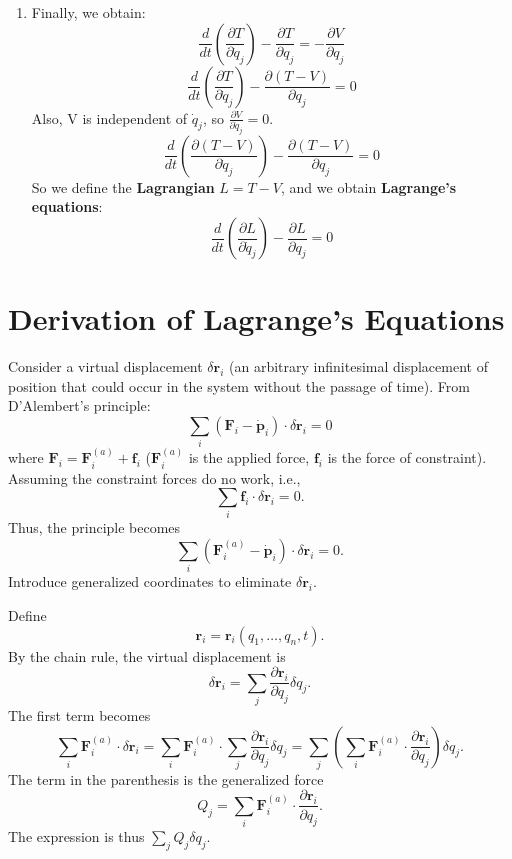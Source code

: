 \documentclass[12pt,a4paper]{article}
\theoremstyle{definition}
\theoremstyle{remark}
\renewcommand{\vec}[1]{\mathbf{#1}}
\begin{document}
\begin{enumerate}
		\item Finally, we obtain:
		\begin{equation*}
			\frac{d}{dt}\left(\frac{\partial T}{\partial \dot{q}_j}\right) - \frac{\partial T}{\partial q_j} = -\frac{\partial V}{\partial q_j}
		\end{equation*}
		\begin{equation*}
			\frac{d}{dt}\left(\frac{\partial T}{\partial \dot{q}_j}\right) - \frac{\partial (T-V)}{\partial q_j} = 0
		\end{equation*}
		Also, V is independent of $\dot{q}_j$, so $\frac{\partial V}{\partial \dot{q}_j} = 0$.
		\begin{equation*}
			\frac{d}{dt}\left(\frac{\partial (T-V)}{\partial \dot{q}_j}\right) - \frac{\partial (T-V)}{\partial q_j} = 0
		\end{equation*}
		So we define the \textbf{Lagrangian} $L=T-V$, and we obtain \textbf{Lagrange's equations}:
		\begin{equation*}
			\frac{d}{dt}\left(\frac{\partial L}{\partial \dot{q}_j}\right) - \frac{\partial L}{\partial q_j} = 0
		\end{equation*}
	\end{enumerate}
	\section{Derivation of Lagrange's Equations }
	Consider a virtual displacement $\delta\vec{r}_i$ (an arbitrary infinitesimal displacement of position that could occur in the system without the passage of time).
	From D'Alembert's principle:
	\begin{equation*}
		\sum_i (\vec{F}_i - \dot{\vec{p}}_i) \cdot \delta\vec{r}_i = 0
	\end{equation*}
	where $\vec{F}_i = \vec{F}_i^{(a)} + \vec{f}_i$ ($\vec{F}_i^{(a)}$ is the applied force, $\vec{f}_i$ is the force of constraint).
	Assuming the constraint forces do no work, i.e.,
	$$ \sum_i \vec{f}_i \cdot \delta\vec{r}_i = 0. $$
	Thus, the principle becomes
	$$ \sum_i (\vec{F}_i^{(a)} - \dot{\vec{p}}_i) \cdot \delta\vec{r}_i = 0. $$
	Introduce generalized coordinates to eliminate $\delta\vec{r}_i$.
	
	Define
	$$ \vec{r}_i = \vec{r}_i(q_1, \dots, q_n, t). $$
	By the chain rule, the virtual displacement is
	$$ \delta\vec{r}_i = \sum_j \frac{\partial \vec{r}_i}{\partial q_j} \delta q_j. $$
	The first term becomes
	$$ \sum_i \vec{F}_i^{(a)} \cdot \delta\vec{r}_i = \sum_i \vec{F}_i^{(a)} \cdot \sum_j \frac{\partial \vec{r}_i}{\partial q_j} \delta q_j = \sum_j \left( \sum_i \vec{F}_i^{(a)} \cdot \frac{\partial \vec{r}_i}{\partial q_j} \right) \delta q_j. $$
	The term in the parenthesis is the generalized force
	$$ Q_j = \sum_i \vec{F}_i^{(a)} \cdot \frac{\partial \vec{r}_i}{\partial q_j}. $$
	The expression is thus $\sum_j Q_j \delta q_j$.
	
\end{document}
